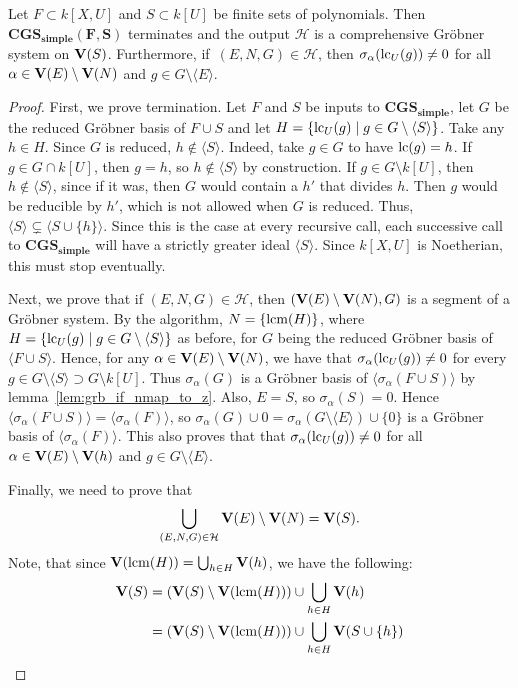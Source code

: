\begin{theorem}\label{thm:CGS_simple}
  Let $F \subset k[X, U]$ and $S \subset k[U]$ be finite sets of polynomials. Then $\mathbf{CGS_{simple}(F, S)}$ terminates and the output $\mathcal H$ is a comprehensive Gröbner system on $\operatorname{\mathbf V}(S)$. Furthermore, if $\,(E, N, G) \in \mathcal H$, then $\sigma_{\alpha}(\operatorname{lc}_{U}(g)) \neq 0$ for all $\alpha \in \operatorname{\mathbf V}(E) \setminus \operatorname{\mathbf V}(N)$ and $g \in G \setminus \langle E \rangle$.
\end{theorem}
\begin{proof}
  First, we prove termination. Let $F$ and $S$ be inputs to $\mathbf{CGS_{simple}}$, let $G$ be the reduced Gröbner basis of $F \cup S$ and let $H = \{\operatorname{lc}_{U}(g) \mid g \in G \setminus \langle S \rangle\}$. Take any $h \in H$. Since $G$ is reduced, $h \notin \langle S \rangle$. Indeed, take $g \in G$ to have $\operatorname{lc}(g) = h$. If $g \in G \cap k[U]$, then $g = h$, so $h \notin \langle S \rangle$ by construction. If $g \in G \setminus k[U]$, then $h \notin \langle S \rangle$, since if it was, then $G$ would contain a $h'$ that divides $h$. Then $g$ would be reducible by $h'$, which is not allowed when $G$ is reduced. Thus, $\langle S \rangle \subsetneq \langle S \cup \{h\} \rangle$. Since this is the case at every recursive call, each successive call to $\mathbf{CGS_{simple}}$ will have a strictly greater ideal $\langle S \rangle$. Since $k[X, U]$ is Noetherian, this must stop eventually.

  Next, we prove that if $(E, N, G) \in \mathcal H$, then $(\operatorname{\mathbf V}(E) \setminus \operatorname{\mathbf V}(N), G)$ is a segment of a Gröbner system. By the algorithm, $N = \{\operatorname{lcm}(H)\}$, where $H = \{\operatorname{lc}_{U}(g) \mid g \in G \setminus \langle S \rangle\}$ as before, for $G$ being the reduced Gröbner basis of $\langle F \cup S \rangle$. Hence, for any $\alpha \in \operatorname{\mathbf V}(E) \setminus \operatorname{\mathbf V}(N)$, we have that $\sigma_{\alpha}(\operatorname{lc}_{U}(g)) \neq 0$ for every $g \in G \setminus \langle S \rangle \supset G \setminus k[U]$. Thus $\sigma_{\alpha}(G)$ is a Gröbner basis of $\langle \sigma_{\alpha}(F \cup S) \rangle$ by lemma~\ref{lem:grb_if_nmap_to_z}. Also, $E = S$, so $\sigma_{\alpha}(S) = 0$. Hence $\langle \sigma_{\alpha}(F \cup S) \rangle = \langle \sigma_{\alpha}(F) \rangle$, so $\sigma_{\alpha}(G) \cup 0 = \sigma_{\alpha}(G \setminus \langle E \rangle) \cup \{0\}$ is a Gröbner basis of $\langle \sigma_{\alpha}(F) \rangle$. This also proves that that $\sigma_{\alpha}(\operatorname{lc}_{U}(g)) \neq 0$ for all $\alpha \in \operatorname{\mathbf V}(E) \setminus \operatorname{\mathbf V}(h)$ and $g \in G \setminus \langle E \rangle$.

  Finally, we need to prove that \[\bigcup_{(E, N, G) \in \mathcal H} \operatorname{\mathbf V}(E) \setminus \operatorname{\mathbf V}(N) = \operatorname{\mathbf V}(S).\]
  Note, that since $\operatorname{\mathbf V}(\operatorname{lcm}(H)) = \bigcup_{h \in H} \operatorname{\mathbf V}(h)$, we have the following:
  \begin{align*}
    \operatorname{\mathbf V}(S) &= (\operatorname{\mathbf V}(S) \setminus \operatorname{\mathbf V}(\operatorname{lcm}(H))) \cup \bigcup_{h \in H} \operatorname{\mathbf V}(h) \\
    &= (\operatorname{\mathbf V}(S) \setminus \operatorname{\mathbf V}(\operatorname{lcm}(H))) \cup \bigcup_{h \in H} \operatorname{\mathbf V}(S \cup \{h\})
  \end{align*}


\end{proof}
